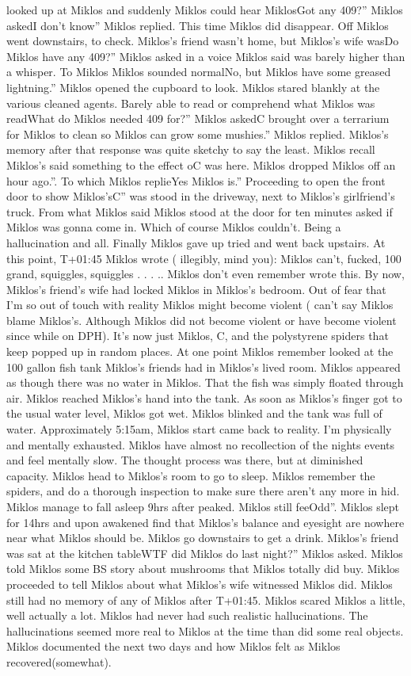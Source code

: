 \documentclass[12pt]{book}
\begin{document}
looked up at Miklos and suddenly Miklos could hear MiklosGot any 409?'' Miklos askedI don't know'' Miklos replied. This time Miklos did disappear. Off Miklos went downstairs, to check. Miklos's friend wasn't home, but Miklos's wife wasDo Miklos have any 409?'' Miklos asked in a voice Miklos said was barely higher than a whisper. To Miklos Miklos sounded normalNo, but Miklos have some greased lightning.'' Miklos opened the cupboard to look. Miklos stared blankly at the various cleaned agents. Barely able to read or comprehend what Miklos was readWhat do Miklos needed 409 for?'' Miklos askedC brought over a terrarium for Miklos to clean so Miklos can grow some mushies.'' Miklos replied. Miklos's memory after that response was quite sketchy to say the least. Miklos recall Miklos's said something to the effect oC was here. Miklos dropped Miklos off an hour ago.''. To which Miklos replieYes Miklos is.'' Proceeding to open the front door to show Miklos'sC'' was stood in the driveway, next to Miklos's girlfriend's truck. From what Miklos said Miklos stood at the door for ten minutes asked if Miklos was gonna come in. Which of course Miklos couldn't. Being a hallucination and all. Finally Miklos gave up tried and went back upstairs. At this point, T+01:45 Miklos wrote ( illegibly, mind you): Miklos can't, fucked, 100 grand, squiggles, squiggles . . . .. Miklos don't even remember wrote this. By now, Miklos's friend's wife had locked Miklos in Miklos's bedroom. Out of fear that I'm so out of touch with reality Miklos might become violent ( can't say Miklos blame Miklos's. Although Miklos did not become violent or have become violent since while on DPH). It's now just Miklos, C, and the polystyrene spiders that keep popped up in random places. At one point Miklos remember looked at the 100 gallon fish tank Miklos's friends had in Miklos's lived room. Miklos appeared as though there was no water in Miklos. That the fish was simply floated through air. Miklos reached Miklos's hand into the tank. As soon as Miklos's finger got to the usual water level, Miklos got wet. Miklos blinked and the tank was full of water. Approximately 5:15am, Miklos start came back to reality. I'm physically and mentally exhausted. Miklos have almost no recollection of the nights events and feel mentally slow. The thought process was there, but at diminished capacity. Miklos head to Miklos's room to go to sleep. Miklos remember the spiders, and do a thorough inspection to make sure there aren't any more in hid. Miklos manage to fall asleep 9hrs after peaked. Miklos still feeOdd''. Miklos slept for 14hrs and upon awakened find that Miklos's balance and eyesight are nowhere near what Miklos should be. Miklos go downstairs to get a drink. Miklos's friend was sat at the kitchen tableWTF did Miklos do last night?'' Miklos asked. Miklos told Miklos some BS story about mushrooms that Miklos totally did buy. Miklos proceeded to tell Miklos about what Miklos's wife witnessed Miklos did. Miklos still had no memory of any of Miklos after T+01:45. Miklos scared Miklos a little, well actually a lot. Miklos had never had such realistic hallucinations. The hallucinations seemed more real to Miklos at the time than did some real objects. Miklos documented the next two days and how Miklos felt as Miklos recovered(somewhat). 
\end{document}
